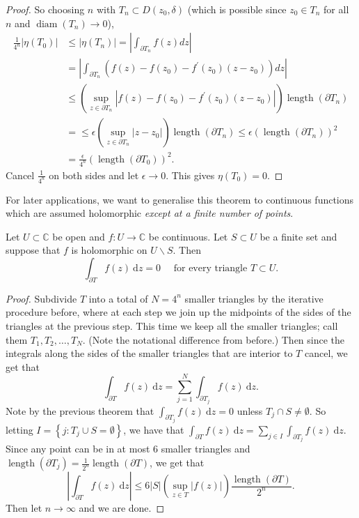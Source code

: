 \documentclass[egregdoesnotlikesansseriftitles,a4paper]{scrartcl}
\begin{document}
\begin{proof}
     So choosing $n$ with $T_{n} \subset D\left(z_{0}, \delta\right)$ (which is possible since $z_{0} \in T_{n}$ for all $n$ and $\operatorname{diam}\left(T_{n}\right) \rightarrow 0$),
     \begin{align*}
          \frac{1}{4^{n}}\left|\eta\left(T_{0}\right)\right| &\leq\left|\eta\left(T_{n}\right)\right|=\left|\int_{\partial T_{n}} f(z) d z\right|\\
          &=\left|\int_{\partial T_{n}}\left(f(z)-f\left(z_{0}\right)-f^{\prime}\left(z_{0}\right)\left(z-z_{0}\right)\right) d z\right|\\
          &\leq\left(\sup _{z \in \partial T_{n}}\left|f(z)-f\left(z_{0}\right)-f^{\prime}\left(z_{0}\right)\left(z-z_{0}\right)\right|\right) \operatorname{length}\left(\partial T_{n}\right)\\
          &=\leq \epsilon\left(\sup _{z \in \partial T_{n}}\left|z-z_{0}\right|\right)\operatorname{length}\left(\partial T_{n}\right) \leq \epsilon\left(\operatorname{length}\left(\partial T_{n}\right)\right)^{2}\\
          &=\frac{\epsilon}{4^{n}}\left(\operatorname{length}\left(\partial T_{0}\right)\right)^{2}.
     \end{align*}
     Cancel $\frac{1}{4^{n}}$ on both sides and let $\epsilon \rightarrow 0$. This gives $\eta\left(T_{0}\right)=0$.
\end{proof}
For later applications, we want to generalise this theorem to continuous functions which are assumed holomorphic \emph{except at a finite number of points}.
\begin{theorem}
      Let $U \subset \mathbb{C}$ be open and $f: U \rightarrow \mathbb{C}$ be continuous. Let $S \subset U$ be a finite set and suppose that $f$ is holomorphic on $U\backslash S$. Then \[
      \int_{\partial T}^{}f (z) \ \mathrm{d} z =0 \quad \text{ for every triangle } T \subset U
      .\] 
\end{theorem}
\begin{proof}
      Subdivide $T$ into a total of $N=4^{n}$ smaller triangles by the iterative procedure before, where at each step we join up the midpoints of the sides of the triangles at the previous step. This time we keep all the smaller triangles; call them $T_1 , T_2 , \ldots , T_N$. (Note the notational difference from before.) Then since the integrals along the sides of the smaller triangles that are interior to $T$ cancel, we get that \[
      \int_{\partial T}^{}f (z) \ \mathrm{d}z = \sum_{j=1}^{N} \int_{ \partial T_{j}}^{}f (z) \ \mathrm{d}z
      .\] Note by the previous theorem that $\int_{ \partial T_{j}}^{}f (z) \ \mathrm{d}z=0$ unless $T_{j}\cap S \neq \emptyset$. So letting $I=\left\{j: T_{j} \cup S = \emptyset\right\}$, we have that $\int_{\partial T}^{}f (z) \ \mathrm{d}z=\sum_{j \in I}^{}\int_{ \partial T_{j}}^{}f (z) \ \mathrm{d}z$. Since any point can be in at most 6 smaller triangles and $\operatorname{length}( \partial T_{j})=\frac{1}{2^{n}}\operatorname{length} ( \partial T)$, we get that \[
      \left|\int_{ \partial T}^{}f (z) \ \mathrm{d}z \right| \leq 6 \left|S\right|\left(\sup_{z \in T} \left|f (z)\right|\right) \frac{\operatorname{length} ( \partial T)}{2^{n}}
      .\] Then let $n \rightarrow \infty$ and we are done.
\end{proof}
\end{document}
